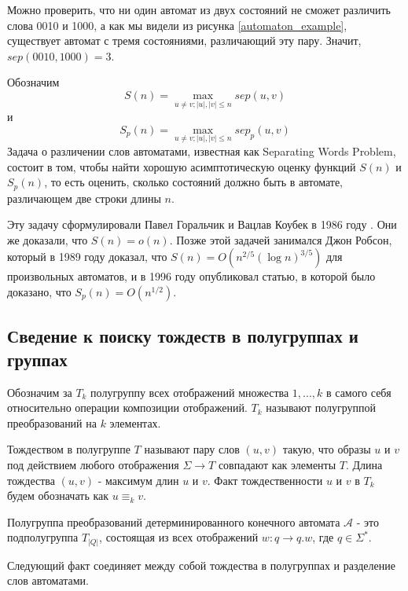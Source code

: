 \begin{example}
	Можно проверить, что ни один автомат из двух состояний не сможет различить слова 0010 и 1000, а как мы видели из рисунка \ref{automaton_example}, существует автомат с тремя состояниями, различающий эту пару. Значит, $sep(0010, 1000) = 3$.
\end{example}

Обозначим
$$
	S(n) = \max_{u \ne v; |u|, |v| \le n} sep(u, v)
$$ 
и
$$
	S_p(n) = \max_{u \ne v; |u|, |v| \le n} sep_p(u, v)
$$
Задача о различении слов автоматами, известная как Separating Words Problem, состоит в том, чтобы найти хорошую асимптотическую оценку функций $S(n)$ и $S_p(n)$, то есть оценить, сколько состояний должно быть в автомате, различающем две строки длины $n$.

Эту задачу сформулировали Павел Горальчик и Вацлав Коубек в 1986 году \cite{on discerning, remarks on separating}. Они же доказали, что $S(n) = o(n)$. Позже этой задачей занимался Джон Робсон, который в 1989 году \cite{robson 1989} доказал, что $S(n) = O(n^{2/5}(\log n)^{3/5})$ для произвольных автоматов, и в 1996 году \cite{robson 1996} опубликовал статью, в которой было доказано, что $S_p(n) = O(n^{1/2})$.

\subsection{Сведение к поиску тождеств в полугруппах и группах}

Обозначим за $T_k$ полугруппу всех отображений множества ${1, ..., k}$ в самого себя относительно операции композиции отображений. $T_k$ называют полугруппой преобразований на $k$ элементах.
\begin{definition}
	Тождеством в полугруппе $T$ называют пару слов $(u, v)$ такую, что образы $u$ и $v$ под действием любого отображения $\Sigma \rightarrow T$ совпадают как элементы $T$. Длина тождества $(u, v)$ - максимум длин $u$ и $v$. Факт тождественности $u$ и $v$ в $T_k$ будем обозначать как $u \equiv_k v$.
\end{definition}

\begin{definition}
	Полугруппа преобразований детерминированного конечного автомата $\mathscr{A}$ - это подполугруппа $T_{|Q|}$, состоящая из всех отображений $w: q \rightarrow q.w$, где $q \in \Sigma^*$.
\end{definition}

Следующий факт соединяет между собой тождества в полугруппах и разделение слов автоматами.

